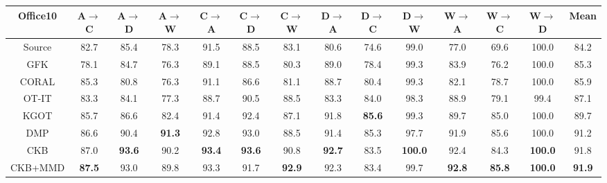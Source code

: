 \documentclass[final]{cvpr}
\begin{document}
\begin{table*}[t]
\begin{tabular}{c|cccccccccccc|c}
\textbf{Office10} & A$\to$C & A$\to$D & A$\to$W & C$\to$A & C$\to$D & C$\to$W &
D$\to$A & D$\to$C & D$\to$W & W$\to$A & W$\to$C & W$\to$D & Mean \\
\hline
Source \cite{krizhevsky2012imagenet} & 82.7 & 85.4 & 78.3 & 91.5 & 88.5 & 83.1 & 80.6 & 74.6 & 99.0 & 77.0 & 69.6 & 100.0 & 84.2 \\
GFK \cite{gong2012geodesic} & 78.1 & 84.7 & 76.3 & 89.1 & 88.5 & 80.3 & 89.0 & 78.4 & 99.3 & 83.9 & 76.2 & 100.0 & 85.3 \\
CORAL \cite{sun2016return} & 85.3 & 80.8 & 76.3 & 91.1 & 86.6 & 81.1 & 88.7 & 80.4 & 99.3 & 82.1 & 78.7 & 100.0 & 85.9 \\
OT-IT \cite{courty2016optimal} & 83.3 & 84.1 & 77.3 & 88.7 & 90.5 & 88.5 & 83.3 & 84.0 & 98.3 & 88.9 & 79.1 & 99.4 & 87.1 \\	
KGOT \cite{zhang2019optimal} & 85.7 & 86.6 & 82.4 & 91.4 & 92.4 & 87.1 & 91.8 & \textbf{85.6} & 99.3 & 89.7 & 85.0 & 100.0 & 89.7 \\
DMP \cite{luo2020unsupervised} & 86.6 & 90.4 & \textbf{91.3} & 92.8 & 93.0 & 88.5 & 91.4 & 85.3 & 97.7 & 91.9 & 85.6 & 100.0 & 91.2 \\
\hline
CKB & 87.0 & \textbf{93.6} & 90.2 & \textbf{93.4} & \textbf{93.6} & 90.8 & \textbf{92.7} & 83.5 & \textbf{100.0} & 92.4 & 84.3 & \textbf{100.0} & 91.8 \\
CKB+MMD & \textbf{87.5} & 93.0 & 89.8 & 93.3 & 91.7 & \textbf{92.9} & 92.3 & 83.4 & 99.7 & \textbf{92.8} & \textbf{85.8} & \textbf{100.0} & \textbf{91.9} \\
\bottomrule[1pt]
\end{tabular}
\vspace{-2pt}
\end{table*}
\end{document}
